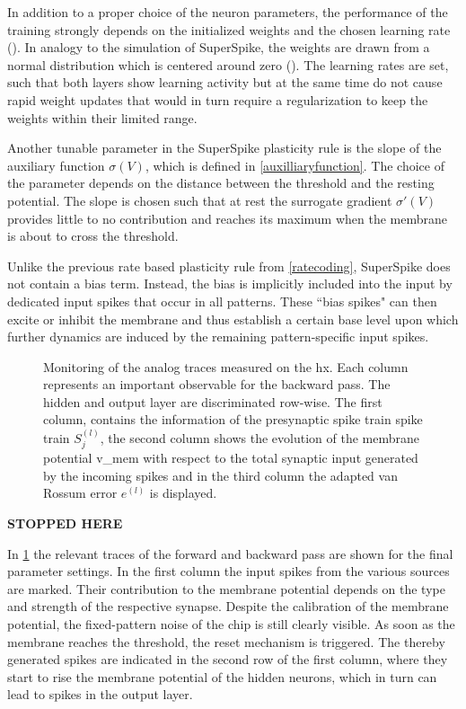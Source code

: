 In addition to a proper choice of the neuron parameters, the performance of the training strongly depends on the initialized weights and the chosen learning rate (\citealp{Goodfellow-et-al-2016}). In analogy to the simulation of SuperSpike, the weights are drawn from a normal distribution which is centered around zero (\citealp{zenke2018superspike}). The learning rates are set, such that both layers show learning activity but at the same time do not cause rapid weight updates that would in turn require a regularization to keep the weights within their limited range.

Another tunable parameter in the SuperSpike plasticity rule is the slope of the auxiliary function $\sigma(V)$, which is defined in \cref{auxilliaryfunction}. The choice of the parameter depends on the distance between the threshold and the resting potential. The slope is chosen such that at rest the surrogate gradient $\sigma'(V)$ provides little to no contribution and reaches its maximum when the membrane is about to cross the threshold.

Unlike the previous rate based plasticity rule from \cref{ratecoding}, SuperSpike does not contain a bias term. Instead, the bias is implicitly included into the input by dedicated input spikes that occur in all patterns. These ``bias spikes" can then excite or inhibit the membrane and thus establish a certain base level upon which further dynamics are induced by the remaining pattern-specific input spikes.

\begin{figure}[htb!]
	\centering
	
	\caption[Monitoring of the analog traces measured on the \gls{hx}.]{Monitoring of the analog traces measured on the \gls{hx}. Each column represents an important observable for the backward pass. The hidden and output layer are discriminated row-wise. The first column, contains the information of the presynaptic spike train spike train $S_j^{(l)}$, the second column shows the evolution of the membrane potential \gls{v_mem} with respect to the total synaptic input generated by the incoming spikes and in the third column the adapted van Rossum error $e^{(l)}$ is displayed.}
	\label{debugplot}
\end{figure}

\textbf{STOPPED HERE}

In \cref{debugplot} the relevant traces of the forward and backward pass are shown for the final parameter settings. In the first column the input spikes from the various sources are marked. Their contribution to the membrane potential depends on the type and strength of the respective synapse. Despite the calibration of the membrane potential, the fixed-pattern noise of the chip is still clearly visible. As soon as the membrane reaches the threshold, the reset mechanism is triggered. The thereby generated spikes are indicated in the second row of the first column, where they start to rise the membrane potential of the hidden neurons, which in turn can lead to spikes in the output layer.

